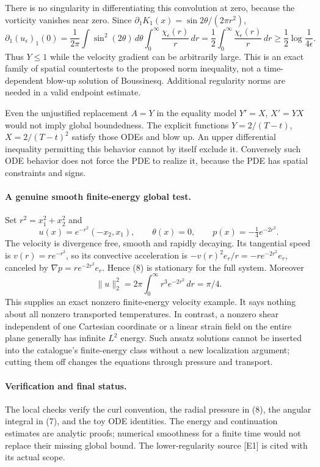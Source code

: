 \documentclass[11pt]{article}
\begin{document}
There is no singularity in differentiating this convolution at zero,
because the vorticity vanishes near zero. Since
$\partial_1K_1(x)=\sin2\theta/(2\pi r^2)$,
\[
 \partial_1(u_\epsilon)_1(0)
   =\frac1{2\pi}\int\sin^2(2\theta)\,d\theta
                         \int_0^\infty\frac{\chi_\epsilon(r)}r\,dr
   =\frac12\int_0^\infty\frac{\chi_\epsilon(r)}r\,dr
   \ge\frac12\log\frac1{4\epsilon}.                     \tag{7}
\]
Thus $Y\le1$ while the velocity gradient can be arbitrarily large.
This is an exact family of spatial countertests to the proposed norm
inequality, not a time-dependent blow-up solution of Boussinesq.
Additional regularity norms are needed in a valid endpoint estimate.

Even the unjustified replacement $A=Y$ in the equality model
$Y'=X$, $X'=YX$ would not imply global boundedness. The explicit
functions $Y=2/(T-t)$, $X=2/(T-t)^2$ satisfy those ODEs and blow up.
An upper differential inequality permitting this behavior cannot by
itself exclude it. Conversely such ODE behavior does not force the PDE
to realize it, because the PDE has spatial constraints and signs.

\paragraph{A genuine smooth finite-energy global test.}
Set $r^2=x_1^2+x_2^2$ and
\[
 u(x)=e^{-r^2}(-x_2,x_1),\qquad
 \theta(x)=0,\qquad p(x)=-\tfrac14e^{-2r^2}.             \tag{8}
\]
The velocity is divergence free, smooth and rapidly decaying.
Its tangential speed is $v(r)=re^{-r^2}$, so its convective acceleration
is $-v(r)^2e_r/r=-re^{-2r^2}e_r$, canceled by
$\nabla p=re^{-2r^2}e_r$. Hence (8) is stationary for the full system.
Moreover
\[
                  \|u\|_2^2=2\pi\int_0^\infty r^3e^{-2r^2}\,dr
                              =\pi/4.
\]
This supplies an exact nonzero finite-energy velocity example.
It says nothing about all nonzero transported temperatures.
In contrast, a nonzero shear independent of one Cartesian coordinate
or a linear strain field on the entire plane generally has infinite
$L^2$ energy. Such ansatz solutions cannot be inserted into the
catalogue's finite-energy class without a new localization argument;
cutting them off changes the equations through pressure and transport.

\paragraph{Verification and final status.}
The local checks verify the curl convention, the radial pressure in
(8), the angular integral in (7), and the toy ODE identities. The
energy and continuation estimates are analytic proofs; numerical
smoothness for a finite time would not replace their missing global
bound. The lower-regularity source [E1] is cited with its actual scope.
\end{document}
